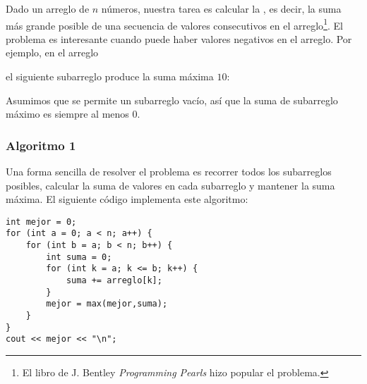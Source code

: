Dado un arreglo de $n$ números,
nuestra tarea es calcular la
, es decir,
la suma más grande posible de
una secuencia de valores consecutivos
en el arreglo\footnote{El libro de J. Bentley \emph{Programming Pearls} \cite{ben86} hizo popular el problema.}.
El problema es interesante cuando puede haber
valores negativos en el arreglo.
Por ejemplo, en el arreglo
\begin{center}
\end{center}
\begin{samepage}
el siguiente subarreglo produce la suma máxima $10$:
\begin{center}
\end{center}
\end{samepage}

Asumimos que se permite un subarreglo vacío,
así que la suma de subarreglo máximo es siempre al menos $0$.

\subsubsection{Algoritmo 1}

Una forma sencilla de resolver el problema
es recorrer todos los subarreglos posibles,
calcular la suma de valores en cada subarreglo y mantener
la suma máxima.
El siguiente código implementa este algoritmo:

\begin{lstlisting}
int mejor = 0;
for (int a = 0; a < n; a++) {
    for (int b = a; b < n; b++) {
        int suma = 0;
        for (int k = a; k <= b; k++) {
            suma += arreglo[k];
        }
        mejor = max(mejor,suma);
    }
}
cout << mejor << "\n";
\end{lstlisting}

